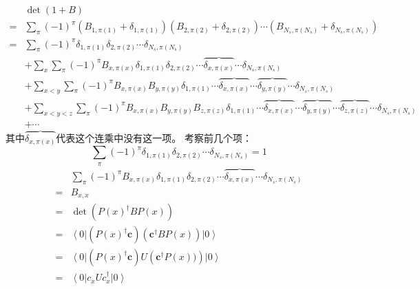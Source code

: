 \documentclass[UTF8,cs4size]{ctexart}
\begin{document}
\[
    \begin{aligned}
        &\det(1+B)\\
        =&\sum_{\pi} (-1)^{\pi} \left(B_{1,\pi(1)} + \delta_{1,\pi(1)}\right)
        \left(B_{2,\pi(2)} + \delta_{2,\pi(2)}\right) \cdots
        \left(B_{N_s,\pi(N_s)} + \delta_{N_s,\pi(N_s)}\right)\\
        =&\sum_{\pi} (-1)^{\pi} \delta_{1,\pi(1)} \delta_{2,\pi(2)} \cdots \delta_{N_s,\pi(N_s)}\\
        &+\sum_{x}\sum_{\pi} (-1)^{\pi} B_{x,\pi(x)} \delta_{1,\pi(1)} \delta_{2,\pi(2)}  \cdots  
        \overbrace{\delta_{x,\pi(x)}} \cdots \delta_{N_s,\pi(N_s)}\\
        &+\sum_{x<y} \sum_{\pi} (-1)^{\pi}  B_{x,\pi(x)}  B_{y,\pi(y)} \delta_{1,\pi(1)}   \cdots  
        \overbrace{\delta_{x,\pi(x)}} \cdots \overbrace{\delta_{y,\pi(y)}} \cdots
        \delta_{N_s,\pi(N_s)}\\
        &+\sum_{x<y<z} \sum_{\pi} (-1)^{\pi} B_{x,\pi(x)}  B_{y,\pi(y)} B_{z,\pi(z)} \delta_{1,\pi(1)}   \cdots  
        \overbrace{\delta_{x,\pi(x)}} \cdots \overbrace{\delta_{y,\pi(y)}} \cdots
        \overbrace{\delta_{z,\pi(z)}} \cdots \delta_{N_s,\pi(N_s)}\\
        &+\cdots
    \end{aligned}    
\]
其中$\overbrace{\delta_{x,\pi(x)}}$代表这个连乘中没有这一项。
考察前几个项：
\[
    \sum_{\pi} (-1)^{\pi} \delta_{1,\pi(1)} \delta_{2,\pi(2)} \cdots \delta_{N_s,\pi(N_s)}=1 
\]
\[
    \begin{aligned}
        &\sum_{\pi} (-1)^{\pi} B_{x,\pi(x)} \delta_{1,\pi(1)} \delta_{2,\pi(2)}  \cdots  
        \overbrace{\delta_{x,\pi(x)}} \cdots \delta_{N_s,\pi(N_s)}\\
        =&B_{x,x}\\
        =&\det\left(P(x)^{\dag}BP(x)\right)\\
        =&\left< 0 \right| \left(P(x)^{\dag} \mathbf{c}\right) \left(\mathbf{c^{\dag}}B P(x)\right)
        \left| 0 \right>\\
        =&\left< 0 \right| \left(P(x)^{\dag} \mathbf{c}\right) U \left(\mathbf{c^{\dag}} P(x))\right)
        \left| 0 \right>\\
        =&\left< 0 \right| c_{x} U c^{\dag}_{x} \left| 0 \right>
    \end{aligned}
\]
\end{document}
